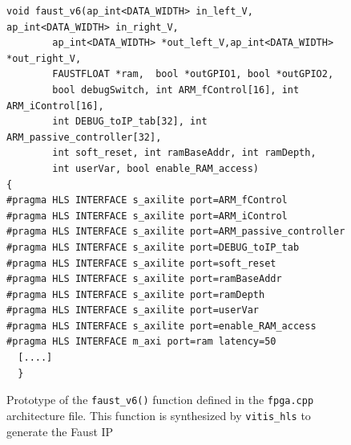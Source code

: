 \documentclass[11pt]{article}
\numberwithin{equation}{section}
\numberwithin{figure}{section}
\begin{document}
\begin{figure}
\begin{boxedminipage}{\textwidth}
    \small
\begin{verbatim}
void faust_v6(ap_int<DATA_WIDTH> in_left_V, ap_int<DATA_WIDTH> in_right_V, 
        ap_int<DATA_WIDTH> *out_left_V,ap_int<DATA_WIDTH> *out_right_V,
        FAUSTFLOAT *ram,  bool *outGPIO1, bool *outGPIO2,
        bool debugSwitch, int ARM_fControl[16], int ARM_iControl[16], 
        int DEBUG_toIP_tab[32], int ARM_passive_controller[32], 
        int soft_reset, int ramBaseAddr, int ramDepth, 
        int userVar, bool enable_RAM_access)
{
#pragma HLS INTERFACE s_axilite port=ARM_fControl
#pragma HLS INTERFACE s_axilite port=ARM_iControl
#pragma HLS INTERFACE s_axilite port=ARM_passive_controller
#pragma HLS INTERFACE s_axilite port=DEBUG_toIP_tab
#pragma HLS INTERFACE s_axilite port=soft_reset
#pragma HLS INTERFACE s_axilite port=ramBaseAddr
#pragma HLS INTERFACE s_axilite port=ramDepth
#pragma HLS INTERFACE s_axilite port=userVar
#pragma HLS INTERFACE s_axilite port=enable_RAM_access
#pragma HLS INTERFACE m_axi port=ram latency=50
  [....]
  }
\end{verbatim}
\end{boxedminipage}
\caption{Prototype of the {\tt faust\_v6()} function defined in the {\tt fpga.cpp} architecture file. This function is synthesized by {\tt vitis\_hls} to generate the Faust IP}
\label{fig:interface}
\end{figure}
  
\end{document}
